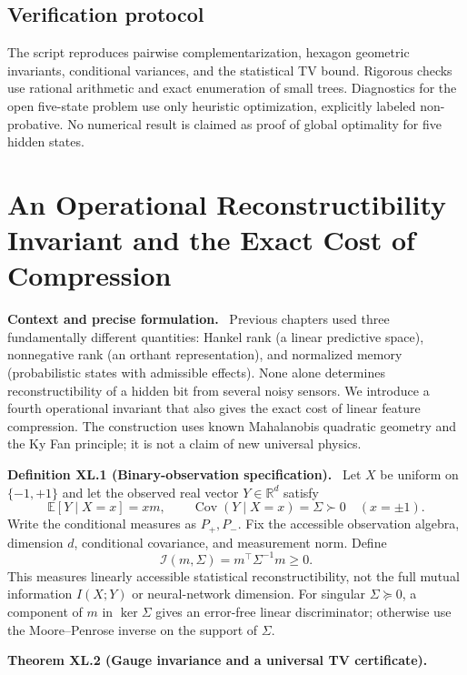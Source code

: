 \documentclass[11pt,a4paper,oneside]{book}
\newcommand{\R}{\mathbb R}\newcommand{\C}{\mathbb C}\newcommand{\Z}{\mathbb Z}\newcommand{\N}{\mathbb N}\newcommand{\Q}{\mathbb Q}
\newcommand{\statement}[3]{\par\medskip\noindent\textbf{#1 #2 (#3).}\ }
\newcommand{\note}[1]{\par\medskip\noindent\textbf{#1}\ }
\begin{document}
\section{Verification protocol}
The script  reproduces pairwise complementarization, hexagon geometric invariants, conditional variances, and the statistical TV bound. Rigorous checks use rational arithmetic and exact enumeration of small trees. Diagnostics for the open five-state problem use only heuristic optimization, explicitly labeled non-probative. No numerical result is claimed as proof of global optimality for five hidden states.
\setcounter{equation}{151}


\chapter{An Operational Reconstructibility Invariant and the Exact Cost of Compression}
\note{Context and precise formulation.} Previous chapters used three fundamentally different quantities: Hankel rank (a linear predictive space), nonnegative rank (an orthant representation), and normalized memory (probabilistic states with admissible effects). None alone determines reconstructibility of a hidden bit from several noisy sensors. We introduce a fourth operational invariant that also gives the exact cost of linear feature compression. The construction uses known Mahalanobis quadratic geometry and the Ky Fan principle; it is not a claim of new universal physics.
\statement{Definition}{XL.1}{Binary-observation specification}
Let $X$ be uniform on $\{-1,+1\}$ and let the observed real vector $Y\in\R^d$ satisfy
\begin{equation}\mathbb E[Y\mid X=x]=xm,\qquad\operatorname{Cov}(Y\mid X=x)=\Sigma\succ0\quad(x=\pm1).\tag{152}\end{equation}
Write the conditional measures as $P_+,P_-$. Fix the accessible observation algebra, dimension $d$, conditional covariance, and measurement norm. Define
\begin{equation}\mathcal I(m,\Sigma)=m^\top\Sigma^{-1}m\ge0.\tag{153}\end{equation}
This measures linearly accessible statistical reconstructibility, not the full mutual information $I(X;Y)$ or neural-network dimension. For singular $\Sigma\succeq0$, a component of $m$ in $\ker\Sigma$ gives an error-free linear discriminator; otherwise use the Moore--Penrose inverse on the support of $\Sigma$.
\statement{Theorem}{XL.2}{Gauge invariance and a universal TV certificate}
\end{document}
